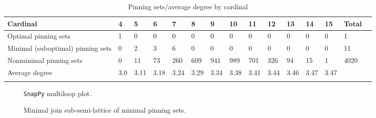 \documentclass{article}%
\begin{document}
\begin{table}[ht]
	\caption{Pinning sets/average degree by cardinal}
	\centering
	\renewcommand{\arraystretch}{1.5}
	\begin{tabularx}{\textwidth}{lXXXXXXXXXXXXXX}
		\toprule
			Cardinal & 4 & 5 & 6 & 7 & 8 & 9 & 10 & 11 & 12 & 13 & 14 & 15 & Total\\
			\hline
			Optimal pinning sets & 1 & 0 & 0 & 0 & 0 & 0 & 0 & 0 & 0 & 0 & 0 & 0 & 1 \\
			Minimal (suboptimal) pinning sets & 0 & 2 & 3 & 6 & 0 & 0 & 0 & 0 & 0 & 0 & 0 & 0 & 11 \\
			Nonminimal pinning sets & 0 & 11 & 73 & 260 & 609 & 941 & 989 & 701 & 326 & 94 & 15 & 1 & 4020 \\
			Average degree & 3.0 & 3.11 & 3.18 & 3.24 & 3.29 & 3.34 & 3.38 & 3.41 & 3.44 & 3.46 & 3.47 & 3.47 &  \\
		\bottomrule \\ 
	\end{tabularx}
\end{table}

\begin{multicols}{2}
\begin{figure}[H]
\centering

\caption{\texttt{SnapPy} multiloop plot.}
\label{fig:tex/img/[[18, 22, 1, 19], [19, 11, 20, 12], [8, 17, 9, 18], [9, 21, 10, 22], [1, 10, 2, 11], [20, 2, 21, 3], [12, 7, 13, 8], [16, 3, 17, 4], [6, 26, 7, 23], [13, 26, 14, 25], [4, 25, 5, 24], [15, 23, 16, 24],.svg}
\end{figure}
\columnbreak

\begin{figure}[H]
\centering
\scalebox{0.8}{}
\caption{Minimal join sub-semi-lattice of minimal pinning sets.}
\label{fig:tex/img/[[18, 22, 1, 19], [19, 11, 20, 12], [8, 17, 9, 18], [9, 21, 10, 22], [1, 10, 2, 11], [20, 2, 21, 3], [12, 7, 13, 8], [16, 3, 17, 4], [6, 26, 7, 23], [13, 26, 14, 25], [4, 25, 5, 24], [15, 23, 16, 24],.pgf}
\end{figure}
\end{multicols}
\end{document}
